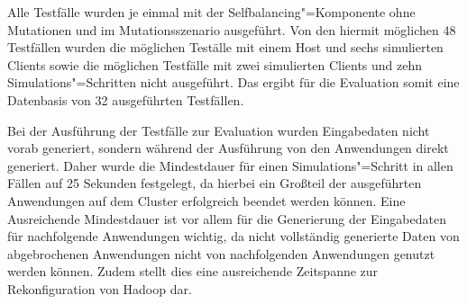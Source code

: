 Alle Testfälle wurden je einmal mit der Selfbalancing"=Komponente ohne Mutationen und im Mutationsszenario ausgeführt.
Von den hiermit möglichen 48 Testfällen wurden die möglichen Teställe mit einem Host und sechs simulierten Clients sowie die möglichen Testfälle mit zwei simulierten Clients und zehn Simulations"=Schritten nicht ausgeführt.
Das ergibt für die Evaluation somit eine Datenbasis von 32 ausgeführten Testfällen.

Bei der Ausführung der Testfälle zur Evaluation wurden Eingabedaten nicht vorab generiert, sondern während der Ausführung von den Anwendungen direkt generiert.
Daher wurde die Mindestdauer für einen Simulations"=Schritt in allen Fällen auf 25 Sekunden festgelegt, da hierbei ein Großteil der ausgeführten Anwendungen auf dem Cluster erfolgreich beendet werden können.
Eine Ausreichende Mindestdauer ist vor allem für die Generierung der Eingabedaten für nachfolgende Anwendungen wichtig, da nicht vollständig generierte Daten von abgebrochenen Anwendungen nicht von nachfolgenden Anwendungen genutzt werden können.
Zudem stellt dies eine ausreichende Zeitspanne zur Rekonfiguration von Hadoop dar.
